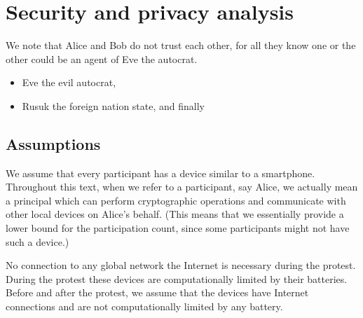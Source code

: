 \mode*

\section{Security and privacy analysis}%
\label{SecurityAnalysis}

We note that Alice and Bob do not trust each other, for all they know one or the 
other could be an agent of Eve the autocrat.
\begin{itemize}
  \item Eve the evil autocrat,
  \item Rusuk the foreign nation state, and finally
\end{itemize}

\subsection{Assumptions}

We assume that every participant has a device similar to a smartphone.
Throughout this text, when we refer to a participant, say Alice, we actually 
mean a principal which can perform cryptographic operations and communicate with 
other local devices on Alice's behalf.
(This means that we essentially provide a lower bound for the participation 
count, since some participants might not have such a device.)


No connection to any global network the Internet is necessary during the 
protest.
During the protest these devices are computationally limited by their 
batteries.
Before and after the protest, we assume that the devices have Internet 
connections and are not computationally limited by any battery.

